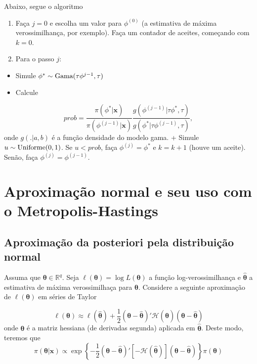 \documentclass[
  letterpaper,
  DIV=11,
  numbers=noendperiod]{scrreprt}
\providecommand{\tightlist}{%
  \setlength{\itemsep}{0pt}\setlength{\parskip}{0pt}}\usepackage{longtable,booktabs,array}
\theoremstyle{plain}
\theoremstyle{definition}
\theoremstyle{definition}
\theoremstyle{remark}
\begin{document}
Abaixo, segue o algoritmo

\begin{enumerate}
\def\labelenumi{\arabic{enumi}.}
\item
  Faça \(j=0\) e escolha um valor para \(\phi^{(0)}\) (a estimativa de
  máxima verossimilhança, por exemplo). Faça um contador de aceites,
  começando com \(k=0\).
\item
  Para o passo \(j\):
\end{enumerate}

\begin{itemize}
\tightlist
\item
  Simule \(\phi^*\sim\hbox{Gama}(\tau\phi^{j-1},\tau)\)
\item
  Calcule
\end{itemize}

\[prob = \frac{\pi(\phi^*|\boldsymbol{x})}{\pi(\phi^{(j-1)}|\boldsymbol{x})}\frac{g(\phi^{(j-1)}|\tau\phi^*,\tau)}{g(\phi^*|\tau\phi^{(j-1)},\tau)},\]
onde \(g(.|a,b)\) é a função densidade do modelo gama. + Simule
\(u\sim\hbox{Uniforme}(0,1)\). Se \(u<prob\), faça \(\phi^{(j)}=\phi^*\)
e \(k=k+1\) (houve um aceite). Senão, faça \(\phi^{(j)}=\phi^{(j-1)}\).


\chapter{Aproximação normal e seu uso com o
Metropolis-Hastings}\label{aproximauxe7uxe3o-normal-e-seu-uso-com-o-metropolis-hastings}

\section{Aproximação da posteriori pela distribuição
normal}\label{aproximauxe7uxe3o-da-posteriori-pela-distribuiuxe7uxe3o-normal}

Assuma que \(\boldsymbol{\theta}\in\mathbb{R}^q\). Seja
\(\ell(\boldsymbol{\theta})=\log L(\boldsymbol{\theta})\) a função
log-verossimilhança e \(\hat{\boldsymbol{\theta}}\) a estimativa de
máxima verossimilhaça para \(\boldsymbol{\theta}\). Considere a seguinte
aproximação de \(\ell(\boldsymbol{\theta})\) em séries de Taylor

\[\ell(\boldsymbol{\theta})\approx  \ell(\hat{\boldsymbol{\theta}})+\frac{1}{2}(\boldsymbol{\theta}-\hat{\boldsymbol{\theta}})'\mathcal{H}(\hat{\boldsymbol{\theta}})(\boldsymbol{\theta}-\hat{\boldsymbol{\theta}})\]
onde \(\boldsymbol{\theta}\) é a matriz hessiana (de derivadas segunda)
aplicada em \(\hat{\boldsymbol{\theta}}\). Deste modo, teremos que
\[\pi(\boldsymbol{\theta}|\boldsymbol{x})\propto \exp\left\{-\frac{1}{2}(\boldsymbol{\theta}-\hat{\boldsymbol{\theta}})'\left[-\mathcal{H}(\hat{\boldsymbol{\theta}})\right](\boldsymbol{\theta}-\hat{\boldsymbol{\theta}})\right\}\pi(\boldsymbol{\theta})\]
\end{document}
